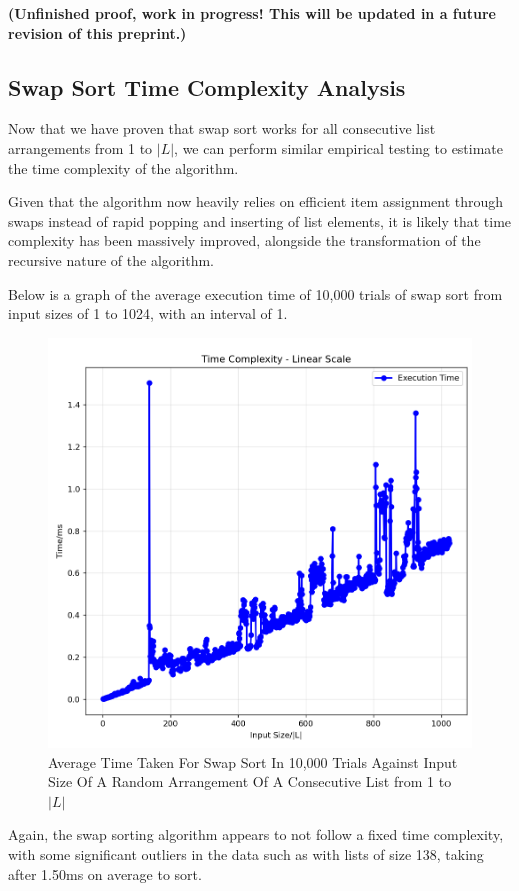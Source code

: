 \documentclass[12pt]{article}
\begin{document}
\textbf{(Unfinished proof, work in progress! This will be updated in a future revision of this preprint.)}

\subsection{Swap Sort Time Complexity Analysis}

Now that we have proven that swap sort works for all consecutive list arrangements from 1 to $|L|$, we can perform similar empirical testing to estimate the time complexity of the algorithm.

Given that the algorithm now heavily relies on efficient item assignment through swaps instead of rapid popping and inserting of list elements, it is likely that time complexity has been massively improved, alongside the transformation of the recursive nature of the algorithm.

Below is a graph of the average execution time of 10,000 trials of swap sort from input sizes of 1 to 1024, with an interval of 1.

\begin{figure}[H]
    \centering
    \includegraphics[width=0.75\linewidth]{Time_Complexity_Swap.png}
    \caption{Average Time Taken For Swap Sort In 10,000 Trials Against Input Size Of A Random Arrangement Of A Consecutive List from 1 to $|L|$}
    \label{fig:placeholder}
\end{figure}

Again, the swap sorting algorithm appears to not follow a fixed time complexity, with some significant outliers in the data such as with lists of size 138, taking after 1.50ms on average to sort.
\end{document}
